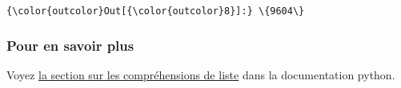 \begin{Verbatim}[commandchars=\\\{\},frame=single,framerule=0.3mm,rulecolor=\color{cellframecolor}]
{\color{outcolor}Out[{\color{outcolor}8}]:} \{9604\}
\end{Verbatim}
            
    \hypertarget{pour-en-savoir-plus}{%
\subsubsection{Pour en savoir plus}\label{pour-en-savoir-plus}}

    Voyez
\href{https://docs.python.org/3/tutorial/datastructures.html\#list-comprehensions}{la
section sur les compréhensions de liste} dans la documentation python.


    
    
    
